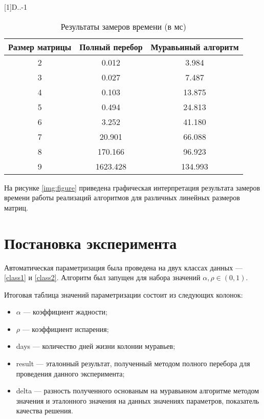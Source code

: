 \newcolumntype{d}[1]{D{.}{.}{-1}}

\begin{table}[h!]
	\begin{center}
		\begin{threeparttable}
			\captionsetup{justification=raggedright,singlelinecheck=off}
			\caption{Результаты замеров времени (в мс)}
			\label{table_measuring}
			\begin{tabular}{|c|c|c|}
				\hline
				Размер матрицы & Полный перебор & Муравьиный алгоритм \\
				\hline
				2 & 0.012 & 3.984\\
				\hline
				3 & 0.027 & 7.487\\
				\hline
				4 & 0.103 & 13.875\\
				\hline
				5 & 0.494 & 24.813\\
				\hline
				6 & 3.252 & 41.180\\
				\hline
				7 & 20.901 & 66.088\\
				\hline
				8 & 170.166 & 96.923\\
				\hline
				9 & 1623.428 & 134.993\\
				\hline
			\end{tabular}
		\end{threeparttable}
	\end{center}
\end{table}

На рисунке \ref{img:figure} приведена графическая интерпретация результата замеров времени работы реализаций алгоритмов для различных линейных размеров матриц.

\section{Постановка эксперимента}

Автоматическая параметризация была проведена на двух классах данных --- \ref{class1} и \ref{class2}. Алгоритм был запущен для набора значений $\alpha, \rho \in (0, 1)$.

Итоговая таблица значений параметризации состоит из следующих колонок:
\begin{itemize}[label=---]
	\item $\alpha$ --- коэффициент жадности;
	\item $\rho$ --- коэффициент испарения;
	\item days --- количество дней жизни колонии муравьев;
	\item result --- эталонный результат, полученный методом полного перебора для проведения данного эксперимента;
	\item delta --- разность полученного основаным на муравьином алгоритме методом значения и эталонного значения на данных значениях параметров, показатель качества решения.
\end{itemize}

